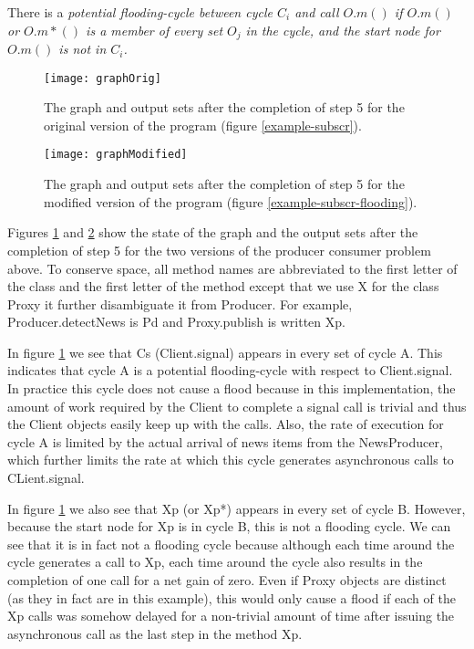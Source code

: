 \documentclass[12pt]{article}%
\begin{document}
\begin{definition}
\label{potential-flooding-cycle}
There is a \em{potential flooding-cycle} between cycle $C_i$ and call $O.m()$ if 
$O.m()$ or $O.m*()$ is a member of every set $O_j$ in the cycle, and
the start node for $O.m()$ is not in $C_i$.
\end{definition}



\begin{figure}[t]
\texttt{[image: graphOrig]}
\caption{\label{graph-orig}
The graph and output sets after the completion of step 5 for the original version of the program (figure \ref{example-subscr}).
}
\end{figure}

\begin{figure}[t]
\texttt{[image: graphModified]}
\caption{\label{graph-modified}
The graph and output sets after the completion of step 5 for the modified version of the program (figure \ref{example-subscr-flooding}).
}
\end{figure}


Figures \ref{graph-orig} and \ref{graph-modified} show the state of the graph and the output sets
after the completion of step 5 for the two versions of the producer consumer problem above. To conserve space, all method names are abbreviated to the
first letter of the class and the first letter of the method except that we use X for the class Proxy it further disambiguate it from Producer. 
For example, Producer.detectNews is Pd and Proxy.publish is written Xp.

In figure \ref{graph-orig} we see that Cs (Client.signal) appears in every set of cycle A. This indicates that cycle A is a potential flooding-cycle
with respect to Client.signal. In practice this cycle does not cause a flood because in this implementation, the amount of work required by the
Client to complete a signal call is trivial and thus the Client objects easily keep up with the calls. Also, the rate of execution for cycle A is
limited by the actual arrival of news items from the NewsProducer, which further limits the rate at which this cycle generates asynchronous calls to
CLient.signal.

In figure \ref{graph-orig} we also see that Xp (or Xp*) appears in every set of cycle B. However, because
the start node for Xp is in cycle B, this is not a flooding cycle. We can see that it is in fact not a flooding cycle 
because although each time around the cycle generates a call to Xp, each time around the cycle also results in the completion of
one call for a net gain of zero. Even if Proxy objects are distinct (as they in fact are in this example), this would only cause 
a flood if each of the Xp calls was somehow delayed for a non-trivial amount of time after issuing the asynchronous call as the 
last step in the method Xp.
\end{document}

